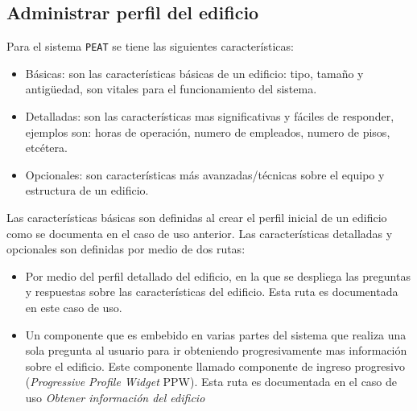 
\subsection{Administrar perfil del edificio}

Para el sistema \texttt{PEAT} se tiene las siguientes características:
\begin{itemize}
\item Básicas: son las características básicas de un edificio: tipo, tamaño y
  antigüedad, son vitales para el funcionamiento del sistema.
\item Detalladas: son las características mas significativas y fáciles de
  responder, ejemplos son: horas de operación, numero de empleados, numero
  de pisos, etcétera.
\item Opcionales: son características más avanzadas/técnicas sobre el equipo
  y estructura de un edificio.
\end{itemize}

Las características básicas son definidas al crear el perfil inicial de un
edificio como se documenta en el caso de uso anterior. Las características
detalladas y opcionales son definidas por medio de dos rutas:

\begin{itemize}
\item Por medio del perfil detallado del edificio, en la que se despliega
  las preguntas y respuestas sobre las características del edificio.
  Esta ruta es documentada en este caso de uso.
\item Un componente que es embebido en varias partes del sistema
  que realiza una sola pregunta al usuario para ir obteniendo progresivamente
  mas información sobre el edificio. Este componente llamado componente
  de ingreso progresivo (\textit{Progressive Profile Widget} PPW).
  Esta ruta es documentada en el caso de uso \textit{Obtener información
    del edificio}
\end{itemize}

